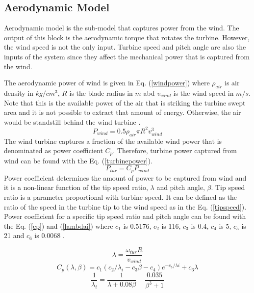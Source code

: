 \subsection{Aerodynamic Model}
Aerodynamic model is the sub-model that captures power from the wind. The output of this block is the aerodynamic torque that rotates the turbine. However, the wind speed is not the only input. Turbine speed and pitch angle are also the inputs of the system since they affect the mechanical power that is captured from the wind.\par
The aerodynamic power of wind is given in Eq. (\ref{windpower}) where $\rho_{air}$ is air density in $kg/cm^{3}$, $R$ is the blade radius in $m$ abd $v_{wind}$ is the wind speed in $m/s$. Note that this is the available power of the air that is striking the turbine swept area and it is not possible to extract that amount of energy. Otherwise, the air would be standstill behind the wind turbine \cite{Ackermann2005a}.
\begin{equation}
P_{wind}=0.5\rho_{air}\pi R^{2} v_{wind}^{3}
\label{windpower}
\end{equation}
The wind turbine captures a fraction of the available wind power that is denominated as power coefficient $C_{p}$. Therefore, turbine power captured from wind can be found with the Eq. (\ref{turbinepower}).
\begin{equation}
P_{tur}=C_{p}P_{wind}
\label{turbinepower}
\end{equation}
Power coefficient determines the amount of power to be captured from wind and it is a non-linear function of the tip speed ratio, $\lambda$ and pitch angle, $\beta$. Tip speed ratio is a parameter proportional with turbine speed. It can be defined as the ratio of the speed in the turbine tip to the wind speed as in the Eq. (\ref{tipspeed}). Power coefficient for a specific tip speed ratio and pitch angle can be found with the Eq. (\ref{cp}) and (\ref{lambdai}) where $c_{1}$ is 0.5176, $c_{2}$ is 116, $c_{3}$ is 0.4, $c_{4}$ is 5, $c_{5}$ is 21 and $c_{6}$ is 0.0068 \cite{Heier}.\par
\begin{equation}
\lambda=\frac{\omega_{tur}R}{v_{wind}}
\label{tipspeed}
\end{equation}
\begin{equation}
C_{p}(\lambda,\beta)=c_{1}(c_{2}/\lambda_{i}-c_{3}\beta-c_{4})e^{-c_{5}/\lambda{i}}+c_{6}\lambda
\label{cp}
\end{equation}
\begin{equation}
\frac{1}{\lambda_{i}}=\frac{1}{\lambda+0.08\beta}-\frac{0.035}{\beta^{3}+1} 
\label{lambdai}
\end{equation}
